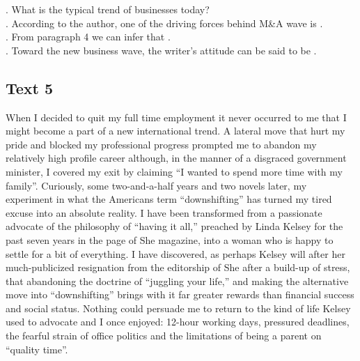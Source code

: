 \begin{questions}  .	What is the typical trend of businesses today?\\
 .	According to the author, one of the driving forces behind M\&A wave is \ltk{}.\\
 .	From paragraph 4 we can infer that \ltk{}.\\
 .	Toward the new business wave, the writer’s attitude can be said to be \ltk{}.\\
\end{questions}    \subsection{Text 5}
When I decided to quit my full time employment it never occurred to me that I might become a part of a new international trend. A lateral move that hurt my pride and blocked my professional progress prompted me to abandon my relatively high profile career although, in the manner of a disgraced government minister, I covered my exit by claiming “I wanted to spend more time with my family”.
Curiously, some two-and-a-half years and two novels later, my experiment in what the Americans term “downshifting” has turned my tired excuse into an absolute reality. I have been transformed from a passionate advocate of the philosophy of “having it all,” preached by Linda Kelsey for the past seven years in the page of She magazine, into a woman who is happy to settle for a bit of everything.
I have discovered, as perhaps Kelsey will after her much-publicized resignation from the editorship of She after a build-up of stress, that abandoning the doctrine of “juggling your life,” and making the alternative move into “downshifting” brings with it far greater rewards than financial success and social status. Nothing could persuade me to return to the kind of life Kelsey used to advocate and I once enjoyed: 12-hour working days, pressured deadlines, the fearful strain of office politics and the limitations of being a parent on “quality time”.
